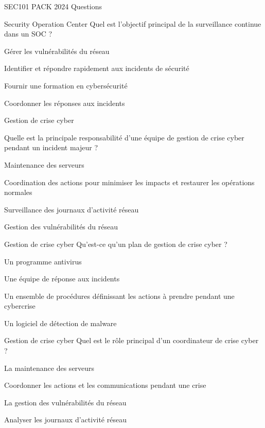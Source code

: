 \documentclass[12pt]{article}
\begin{document}
\begin{quiz}{SEC101 PACK 2024 Questions}
\begin{multi}[points=1]{Security Operation Center}
Quel est l'objectif principal de la surveillance continue dans un SOC ?
    \item Gérer les vulnérabilités du réseau
    \item *Identifier et répondre rapidement aux incidents de sécurité
    \item Fournir une formation en cybersécurité
    \item Coordonner les réponses aux incidents
\end{multi}

\begin{multi}[points=1]{Gestion de crise cyber}

Quelle est la principale responsabilité d'une équipe de gestion de crise cyber pendant un incident majeur ?
    \item Maintenance des serveurs
    \item *Coordination des actions pour minimiser les impacts et restaurer les opérations normales
    \item Surveillance des journaux d'activité réseau
    \item Gestion des vulnérabilités du réseau
\end{multi}

\begin{multi}[points=1]{Gestion de crise cyber}
Qu'est-ce qu'un plan de gestion de crise cyber ?
    \item Un programme antivirus
    \item Une équipe de réponse aux incidents
    \item *Un ensemble de procédures définissant les actions à prendre pendant une cybercrise
    \item Un logiciel de détection de malware
\end{multi}

\begin{multi}[points=1]{Gestion de crise cyber}
Quel est le rôle principal d'un coordinateur de crise cyber ?
    \item La maintenance des serveurs
    \item *Coordonner les actions et les communications pendant une crise
    \item La gestion des vulnérabilités du réseau
    \item Analyser les journaux d'activité réseau
\end{multi}


\end{quiz}
\end{document}
